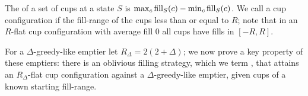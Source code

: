 The  of a set of cups at a state $S$ is $\max_c
\operatorname{\text{\textup{fill}}}_S(c) - \min_c \operatorname{\text{\textup{fill}}}_S(c)$. We call a cup configuration
 if the fill-range of the cups less than or equal to
$R$; note that in an $R$-flat cup configuration with average fill
$0$ all cups have fills in $[-R, R]$. 

For a $\Delta$-greedy-like emptier let $R_\Delta = 2(2+\Delta)$;
we now prove a key property of these emptiers: there is an
oblivious filling strategy, which we term , that
attains an $R_\Delta$-flat cup configuration against a
$\Delta$-greedy-like emptier, given cups of a known starting
fill-range.


